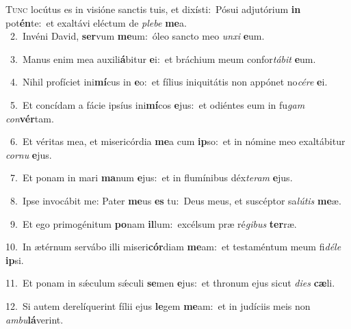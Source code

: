 \lettrine{\initial\textcolor{\initialcolor}{T}}{unc} locútus es in visióne sanctis tuis, et dixísti:~\dagger Pósui adjutórium \textbf{in} pot\-\textbf{én}\-te:~\star et exaltávi eléctum de \textit{ple}\-\textit{be} \textbf{me}\-a.\\
{\numbfont\textcolor{\numbcolor}{~2.}}~Invéni David, \textbf{ser}\-vum \textbf{me}\-um:~\star óleo sancto meo \textit{un}\-\textit{xi} \textbf{e}\-um.\par
{\numbfont\textcolor{\numbcolor}{~3.}}~Manus enim mea auxili\-\textbf{á}\-bitur \textbf{e}\-i:~\star et bráchium meum confor\-\textit{tá}\-\textit{bit} \textbf{e}\-um.\par
{\numbfont\textcolor{\numbcolor}{~4.}}~Nihil profíciet ini\-\textbf{mí}\-cus in \textbf{e}\-o:~\star et fílius iniquitátis non appónet no\-\textit{cé}\-\textit{re} \textbf{e}\-i.\par
{\numbfont\textcolor{\numbcolor}{~5.}}~Et concídam a fácie ipsíus ini\-\textbf{mí}\-cos \textbf{e}\-jus:~\star et odiéntes eum in fu\textit{gam} \textit{con}\-\textbf{vér}tam.\par
{\numbfont\textcolor{\numbcolor}{~6.}}~Et véritas mea, et misericórdia \textbf{me}\-a cum \textbf{ip}\-so:~\star et in nómine meo exaltábitur \textit{cor}\-\textit{nu} \textbf{e}\-jus.\par
{\numbfont\textcolor{\numbcolor}{~7.}}~Et ponam in mari \textbf{ma}\-num \textbf{e}\-jus:~\star et in flumínibus déx\-\textit{te}\-\textit{ram} \textbf{e}\-jus.\par
{\numbfont\textcolor{\numbcolor}{~8.}}~Ipse invocábit me: Pater \textbf{me}\-us \textbf{es} tu:~\star Deus meus, et suscéptor sa\-\textit{lú}\-\textit{tis} \textbf{me}\-æ.\par
{\numbfont\textcolor{\numbcolor}{~9.}}~Et ego primogénitum \textbf{po}\-nam \textbf{il}\-lum:~\star excélsum præ ré\-\textit{gi}\-\textit{bus} \textbf{ter}\-ræ.\par
{\numbfont\textcolor{\numbcolor}{10.}}~In ætérnum servábo illi miseri\-\textbf{cór}\-diam \textbf{me}\-am:~\star et testaméntum meum fi\-\textit{dé}\-\textit{le} \textbf{ip}\-si.\par
{\numbfont\textcolor{\numbcolor}{11.}}~Et ponam in sǽculum sǽculi \textbf{se}\-men \textbf{e}\-jus:~\star et thronum ejus sicut \textit{di}\-\textit{es} \textbf{cæ}\-li.\par
{\numbfont\textcolor{\numbcolor}{12.}}~Si autem derelíquerint fílii ejus \textbf{le}\-gem \textbf{me}\-am:~\star et in judíciis meis non \textit{am}\-\textit{bu}\textbf{lá}verint.\par
